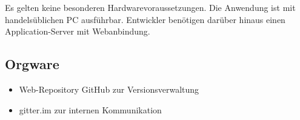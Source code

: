 Es gelten keine besonderen Hardwarevoraussetzungen. Die Anwendung ist mit handelsüblichen PC ausführbar. Entwickler benötigen darüber hinaus einen Application-Server mit Webanbindung.

\subsection{Orgware}

\begin{itemize}
\item Web-Repository GitHub zur Versionsverwaltung
\item gitter.im zur internen Kommunikation 
\end{itemize}
